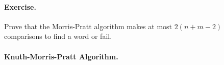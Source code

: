 \medskip

\paragraph{Exercise.}
\label{ex:factore_matching}

Prove that the Morris\hyp{}Pratt algorithm makes at most \(2(n+m-2)\)
comparisons to find a word or fail.






\medskip

\paragraph{Knuth\hyp{}Morris\hyp{}Pratt Algorithm.}

